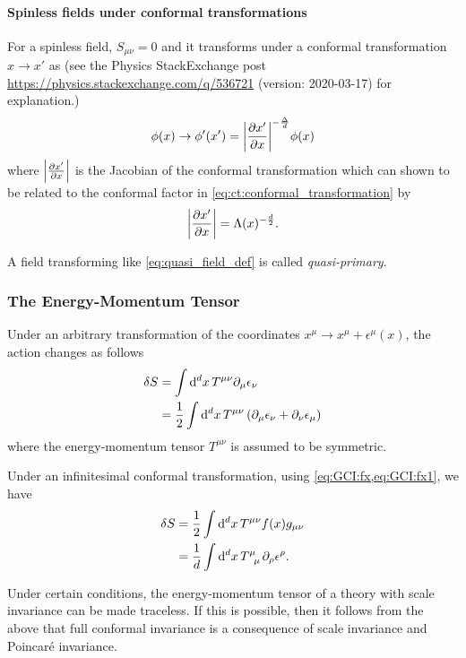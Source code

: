 \documentclass[10pt]{article}
\begin{document}
\paragraph{Spinless fields under conformal transformations}
For a spinless field, $S_{\mu\nu}=0$ and it transforms under a conformal transformation $x\to x'$ as (see the Physics StackExchange post \url{https://physics.stackexchange.com/q/536721} (version: 2020-03-17) for explanation.)
\begin{align}
    \phi(x)\to\phi'(x')=\abs{\pdv{x'}{x}}^{-\frac{\Delta}{d}}\phi(x)\label{eq:representation:spinless_trans}
\end{align}
where $\abs{\pdv{x'}{x}}$ is the Jacobian of the conformal transformation which can shown to be related to the conformal factor in \cref{eq:ct:conformal_transformation} by 
\begin{align}
    \abs{\pdv{x'}{x}}=\Lambda(x)^{-\frac{d}{2}}.\label{eq:quasi_field_def}
\end{align}

A field transforming like \cref{eq:quasi_field_def} is called \textit{quasi-primary}. 


\subsubsection{The Energy-Momentum Tensor}
Under an arbitrary transformation of the coordinates $x^\mu\to x^\mu+\epsilon^\mu(x)$, the action changes as follows 
\begin{align}
    \delta S&=\int\dd[d]{x}T^{\mu\nu}\partial_\mu\epsilon_\nu \notag\\
            &=\frac{1}{2}\int\dd[d]{x}T^{\mu\nu}\left(\partial_\mu\epsilon_\nu+\partial_\nu\epsilon_\mu\right)
\end{align}
where the energy-momentum tensor $T^{\mu\nu}$ is assumed to be symmetric.

Under an infinitesimal conformal transformation, using \cref{eq:GCI:fx,eq:GCI:fx1}, we have 
\begin{align}
    \delta S&=\frac{1}{2}\int\dd[d]{x}T^{\mu\nu}f(x)g_{\mu\nu}\notag\\
            &=\frac{1}{d}\int\dd[d]{x}\tensor{T}{^\mu_\mu}\partial_\rho\epsilon^\rho.
\end{align}
\begin{intu}
    Under certain conditions, the energy-momentum tensor of a theory with scale invariance can be made traceless.
    If this is possible, then it follows from the above that full conformal invariance is a consequence of scale invariance and Poincar\'e invariance.
\end{intu}
\end{document}
